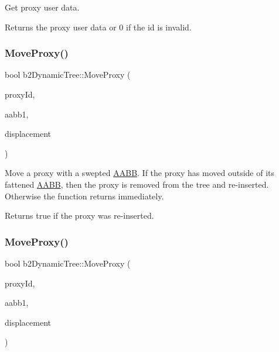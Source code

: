 Get proxy user data. \begin{DoxyReturn}{Returns}
the proxy user data or 0 if the id is invalid. 
\end{DoxyReturn}
\mbox{\label{classb2DynamicTree_a7748252811f3c575015931399cbe4daa}} 
\subsubsection{\texorpdfstring{Move\+Proxy()}{MoveProxy()}\hspace{0.1cm}{\footnotesize\ttfamily [1/2]}}
{\footnotesize\ttfamily bool b2\+Dynamic\+Tree\+::\+Move\+Proxy (\begin{DoxyParamCaption}\item[{int32}]{proxy\+Id,  }\item[{const \hyperlink{structb2AABB}{b2\+A\+A\+BB} \&}]{aabb1,  }\item[{const \hyperlink{structb2Vec2}{b2\+Vec2} \&}]{displacement }\end{DoxyParamCaption})}

Move a proxy with a swepted \hyperlink{classAABB}{A\+A\+BB}. If the proxy has moved outside of its fattened \hyperlink{classAABB}{A\+A\+BB}, then the proxy is removed from the tree and re-\/inserted. Otherwise the function returns immediately. \begin{DoxyReturn}{Returns}
true if the proxy was re-\/inserted. 
\end{DoxyReturn}
\mbox{\label{classb2DynamicTree_a7748252811f3c575015931399cbe4daa}} 
\subsubsection{\texorpdfstring{Move\+Proxy()}{MoveProxy()}\hspace{0.1cm}{\footnotesize\ttfamily [2/2]}}
{\footnotesize\ttfamily bool b2\+Dynamic\+Tree\+::\+Move\+Proxy (\begin{DoxyParamCaption}\item[{int32}]{proxy\+Id,  }\item[{const \hyperlink{structb2AABB}{b2\+A\+A\+BB} \&}]{aabb1,  }\item[{const \hyperlink{structb2Vec2}{b2\+Vec2} \&}]{displacement }\end{DoxyParamCaption})}

